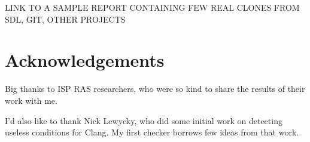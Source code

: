 \documentclass[a0,portrait]{a0poster}
\begin{document}
\begin{multicols}{2}
LINK TO A SAMPLE REPORT CONTAINING FEW REAL CLONES FROM SDL, GIT, OTHER PROJECTS


\nocite{*}



\section*{Acknowledgements}

Big thanks to ISP RAS researchers, who were so kind to share the results of their work
with me.

I'd also like to thank Nick Lewycky, who did some initial work on detecting useless
conditions for Clang. My first checker borrows few ideas from that work.


\end{multicols}
\end{document}
